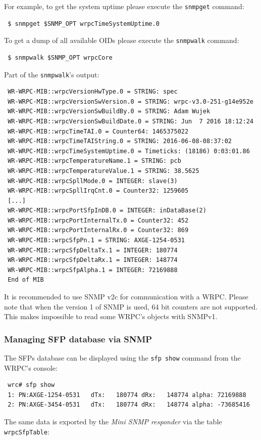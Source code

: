 \documentclass[a4paper, 12pt]{article}
\renewcommand{\_}{\underscore\allowbreak}
\begin{document}
For example, to get the system uptime please execute the \texttt{snmpget} command:
\begin{lstlisting}
 $ snmpget $SNMP_OPT wrpcTimeSystemUptime.0
\end{lstlisting}
To get a dump of all available OIDs please execute the \texttt{snmpwalk}
command:
\begin{lstlisting}
 $ snmpwalk $SNMP_OPT wrpcCore
\end{lstlisting}
Part of the \texttt{snmpwalk}'s output:
\begin{lstlisting}
 WR-WRPC-MIB::wrpcVersionHwType.0 = STRING: spec
 WR-WRPC-MIB::wrpcVersionSwVersion.0 = STRING: wrpc-v3.0-251-g14e952e
 WR-WRPC-MIB::wrpcVersionSwBuildBy.0 = STRING: Adam Wujek
 WR-WRPC-MIB::wrpcVersionSwBuildDate.0 = STRING: Jun  7 2016 18:12:24
 WR-WRPC-MIB::wrpcTimeTAI.0 = Counter64: 1465375022
 WR-WRPC-MIB::wrpcTimeTAIString.0 = STRING: 2016-06-08-08:37:02
 WR-WRPC-MIB::wrpcTimeSystemUptime.0 = Timeticks: (18186) 0:03:01.86
 WR-WRPC-MIB::wrpcTemperatureName.1 = STRING: pcb
 WR-WRPC-MIB::wrpcTemperatureValue.1 = STRING: 38.5625
 WR-WRPC-MIB::wrpcSpllMode.0 = INTEGER: slave(3)
 WR-WRPC-MIB::wrpcSpllIrqCnt.0 = Counter32: 1259605
 [...]
 WR-WRPC-MIB::wrpcPortSfpInDB.0 = INTEGER: inDataBase(2)
 WR-WRPC-MIB::wrpcPortInternalTx.0 = Counter32: 452
 WR-WRPC-MIB::wrpcPortInternalRx.0 = Counter32: 869
 WR-WRPC-MIB::wrpcSfpPn.1 = STRING: AXGE-1254-0531
 WR-WRPC-MIB::wrpcSfpDeltaTx.1 = INTEGER: 180774
 WR-WRPC-MIB::wrpcSfpDeltaRx.1 = INTEGER: 148774
 WR-WRPC-MIB::wrpcSfpAlpha.1 = INTEGER: 72169888
 End of MIB
\end{lstlisting}

It is recommended to use SNMP v2c for communication with a WRPC.
Please note that when the version 1 of SNMP is used, 64 bit counters are not
supported. This makes impossible to read some WRPC's objects with
SNMPv1.

\subsubsection{Managing SFP database via SNMP}
\label{Managing SFP database via SNMP}

The SFPs database can be displayed using the \texttt{sfp show} command from
the WRPC's console:
\begin{lstlisting}
 wrc# sfp show
 1: PN:AXGE-1254-0531   dTx:   180774 dRx:   148774 alpha: 72169888
 2: PN:AXGE-3454-0531   dTx:   180774 dRx:   148774 alpha: -73685416
\end{lstlisting}
The same data is exported by the \textit{Mini SNMP responder} via the table
\texttt{wrpcSfpTable}:
\end{document}
